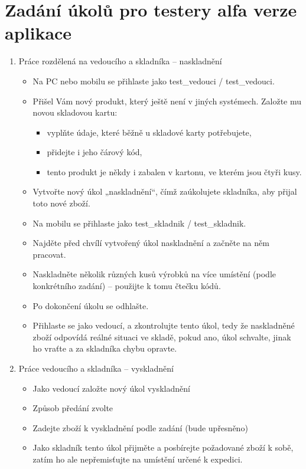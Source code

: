\chapter{Zadání úkolů pro testery alfa verze aplikace} \label{ap:testing_tasks}

\begin{enumerate}
	\item Práce rozdělená na vedoucího a skladníka – naskladnění
	\begin{itemize}
		\item Na PC nebo mobilu se přihlaste jako test\_vedouci / test\_vedouci.
		\item Přišel Vám nový produkt, který ještě není v jiných systémech. Založte mu novou skladovou kartu:
		\begin{itemize}
			\item vyplňte údaje, které běžně u skladové karty potřebujete,
			\item přidejte i jeho čárový kód,
			\item tento produkt je někdy i zabalen v kartonu, ve kterém jsou čtyři kusy.
		\end{itemize}
		\item Vytvořte nový úkol „naskladnění“, čímž zaúkolujete skladníka, aby přijal toto nové zboží.
		\item Na mobilu se přihlaste jako test\_skladnik / test\_skladnik.
		\item Najděte před chvílí vytvořený úkol naskladnění a začněte na něm pracovat.
		\item Naskladněte několik různých kusů výrobků na více umístění (podle konkrétního zadání) – použijte k tomu čtečku kódů.
		\item Po dokončení úkolu se odhlašte.
		\item Přihlaste se jako vedoucí, a zkontrolujte tento úkol, tedy že naskladněné zboží odpovídá reálné situaci ve skladě, pokud ano, úkol schvalte, jinak ho vraťte a za skladníka chybu opravte.
	\end{itemize}
	\item Práce vedoucího a skladníka – vyskladnění
	\begin{itemize}
		\item Jako vedoucí založte nový úkol vyskladnění
		\item Způsob předání zvolte 
		\item Zadejte zboží k vyskladnění podle zadání (bude upřesněno)
		\item Jako skladník tento úkol přijměte a posbírejte požadované zboží k sobě, zatím ho ale nepřemisťujte na umístění určené k expedici.

\end{itemize}
\end{enumerate}
